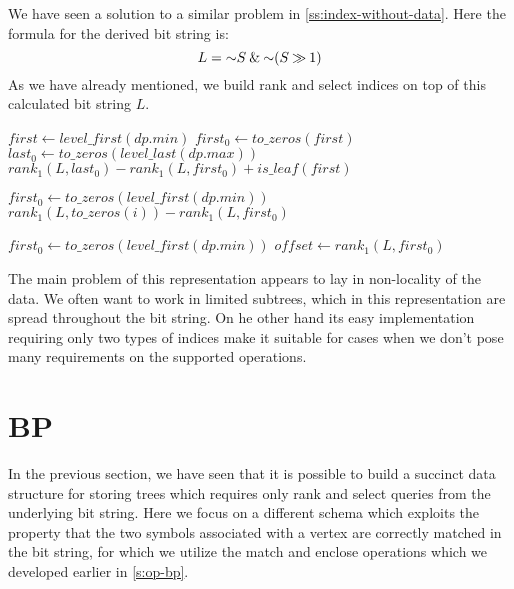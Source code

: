 We have seen a solution to a similar problem in \ref{ss:index-without-data}.
Here the formula for the derived bit string is:
$$L = \mathord{\sim} S \mathbin{\&} \mathord{\sim} (S \mathbin{\gg} 1)$$
As we have already mentioned, we build rank and select indices on top of this calculated bit string $L$.

\begin{algorithmic}
	\State $first \gets level\_first(dp.min)$ 
	\State $first_0 \gets to\_zeros(first)$
	\State $last_0 \gets to\_zeros(level\_last(dp.max))$
	\State \Return $rank_1(L, last_0) - rank_1(L, first_0) + is\_leaf(first)$
\EndFunction
\end{algorithmic}

\begin{algorithmic}	
		\State {}
		\State {}
	\Else
		\State $first_0 \gets to\_zeros(level\_first(dp.min))$
		\State $rank_1(L, to\_zeros(i)) - rank_1(L, first_0)$
	\EndIf
\EndFunction
\end{algorithmic}

\begin{algorithmic}
		\State {}
	\Else
		\State $first_0 \gets to\_zeros(level\_first(dp.min))$
		\State $offset \gets rank_1(L, first_0)$
		\State {}
	\EndIf
\EndFunction
\end{algorithmic}

\bigskip

The main problem of this representation appears to lay in non-locality of the data.
We often want to work in limited subtrees, which in this representation are spread throughout the bit string.
On he other hand its easy implementation requiring only two types of indices make it suitable for cases when we don't pose many requirements on the supported operations.

\section{BP}

In the previous section, we have seen that it is possible to build a succinct data structure for storing trees which requires only rank and select queries from the underlying bit string.
Here we focus on a different schema which exploits the property that the two symbols associated with a vertex are correctly matched in the bit string, for which we utilize the match and enclose operations which we developed earlier in \ref{s:op-bp}.

